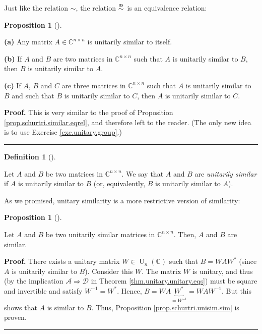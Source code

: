 \documentclass[numbers=enddot,12pt,final,onecolumn,notitlepage]{scrartcl}%
\numberwithin{exer}{subsection}
\theoremstyle{definition}
\newtheorem{prop}[theo]{Proposition}
\newenvironment{proposition}[1][]
{\begin{prop}[#1]\begin{leftbar}}
{\end{leftbar}\end{prop}}
\newtheorem{defi}[theo]{Definition}
\newenvironment{definition}[1][]
{\begin{defi}[#1]\begin{leftbar}}
{\end{leftbar}\end{defi}}
\newenvironment{proof}[1][Proof]{\noindent\textbf{#1.} }{\ \rule{0.5em}{0.5em}}
\begin{document}
Just like the relation $\sim$, the relation $\overset{\operatorname*{us}%
}{\sim}$\ is an equivalence relation:

\begin{proposition}
\label{prop.schurtri.unisim.eqrel}\textbf{(a)} Any matrix $A\in\mathbb{C}%
^{n\times n}$ is unitarily similar to itself. \medskip

\textbf{(b)} If $A$ and $B$ are two matrices in $\mathbb{C}^{n\times n}$ such
that $A$ is unitarily similar to $B$, then $B$ is unitarily similar to $A$.
\medskip

\textbf{(c)} If $A$, $B$ and $C$ are three matrices in $\mathbb{C}^{n\times
n}$ such that $A$ is unitarily similar to $B$ and such that $B$ is unitarily
similar to $C$, then $A$ is unitarily similar to $C$.
\end{proposition}

\begin{proof}
This is very similar to the proof of Proposition
\ref{prop.schurtri.similar.eqrel}, and therefore left to the reader. (The only
new idea is to use Exercise \ref{exe.unitary.group}.)
\end{proof}

\begin{definition}
Let $A$ and $B$ be two matrices in $\mathbb{C}^{n\times n}$. We say that $A$
and $B$ are \emph{unitarily similar} if $A$ is unitarily similar to $B$ (or,
equivalently, $B$ is unitarily similar to $A$).
\end{definition}

As we promised, unitary similarity is a more restrictive version of similarity:

\begin{proposition}
\label{prop.schurtri.unisim.sim}Let $A$ and $B$ be two unitarily similar
matrices in $\mathbb{C}^{n\times n}$. Then, $A$ and $B$ are similar.
\end{proposition}

\begin{proof}
There exists a unitary matrix $W\in\operatorname*{U}\nolimits_{n}\left(
\mathbb{C}\right)  $ such that $B=WAW^{\ast}$ (since $A$ is unitarily similar
to $B$). Consider this $W$. The matrix $W$ is unitary, and thus (by the
implication $\mathcal{A}\Longrightarrow\mathcal{D}$ in Theorem
\ref{thm.unitary.unitary.eqs}) must be square and invertible and satisfy
$W^{-1}=W^{\ast}$. Hence, $B=WA\underbrace{W^{\ast}}_{=W^{-1}}=WAW^{-1}$. But
this shows that $A$ is similar to $B$. Thus, Proposition
\ref{prop.schurtri.unisim.sim} is proven.
\end{proof}
\end{document}
